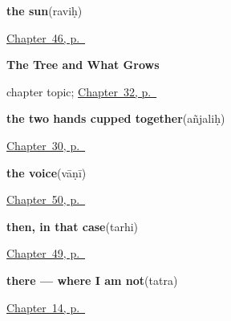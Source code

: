 \noindent\begin{minipage}[t]{\linewidth}
\raggedright
\textbf{the sun}\enspace\emph{}\enspace(raviḥ)\par
\footnotesize \hyperref[ch:sa-sun-and-shade]{Chapter~46, p.~\pageref*{ch:sa-sun-and-shade}}
\end{minipage}\par\smallskip

\noindent\begin{minipage}[t]{\linewidth}
\raggedright
\textbf{The Tree and What Grows}\par
\footnotesize chapter topic; \hyperref[ch:sa-tree]{Chapter~32, p.~\pageref*{ch:sa-tree}}
\end{minipage}\par\smallskip

\noindent\begin{minipage}[t]{\linewidth}
\raggedright
\textbf{the two hands cupped together}\enspace\emph{}\enspace(añjaliḥ)\par
\footnotesize \hyperref[ch:sa-welcome]{Chapter~30, p.~\pageref*{ch:sa-welcome}}
\end{minipage}\par\smallskip

\noindent\begin{minipage}[t]{\linewidth}
\raggedright
\textbf{the voice}\enspace\emph{}\enspace(vāṇī)\par
\footnotesize \hyperref[ch:sa-sound-and-song]{Chapter~50, p.~\pageref*{ch:sa-sound-and-song}}
\end{minipage}\par\smallskip

\noindent\begin{minipage}[t]{\linewidth}
\raggedright
\textbf{then, in that case}\enspace\emph{}\enspace(tarhi)\par
\footnotesize \hyperref[ch:sa-small-answers]{Chapter~49, p.~\pageref*{ch:sa-small-answers}}
\end{minipage}\par\smallskip

\noindent\begin{minipage}[t]{\linewidth}
\raggedright
\textbf{there — where I am not}\enspace\emph{}\enspace(tatra)\par
\footnotesize \hyperref[ch:sa-pointing-and-asking]{Chapter~14, p.~\pageref*{ch:sa-pointing-and-asking}}
\end{minipage}\par\smallskip

